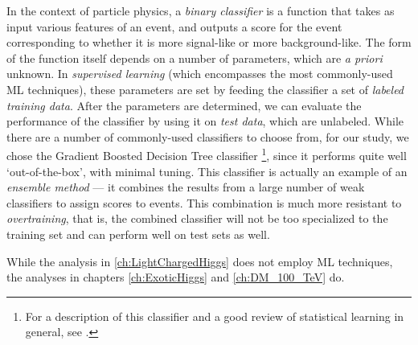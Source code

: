 In the context of particle physics, a \emph{binary classifier} is a function that takes as input various features of an event, and outputs a score for the event corresponding to whether it is more signal-like or more background-like. The form of the function itself depends on a number of parameters, which are \emph{a priori} unknown. In \emph{supervised learning} (which encompasses the most commonly-used ML techniques), these parameters are set by feeding the classifier a set of \emph{labeled training data}. After the parameters are determined, we can evaluate the performance of the classifier by using it on \emph{test data}, which are unlabeled. While there are a number of commonly-used classifiers to choose from, for our study, we chose the Gradient Boosted Decision Tree classifier \footnote{For a description of this classifier and a good review of statistical learning in general, see \citep{Hastie2011}.}, since it performs quite well `out-of-the-box', with minimal tuning. This classifier is actually an example of an \emph{ensemble method} --- it combines the results from a large number of weak classifiers to assign scores to events. This combination is much more resistant to \emph{overtraining}, that is, the combined classifier will not be too specialized to the training set and can perform well on test sets as well.

While the analysis in \autoref{ch:LightChargedHiggs} does not employ ML techniques, the analyses in chapters \ref{ch:ExoticHiggs} and \ref{ch:DM_100_TeV} do.
